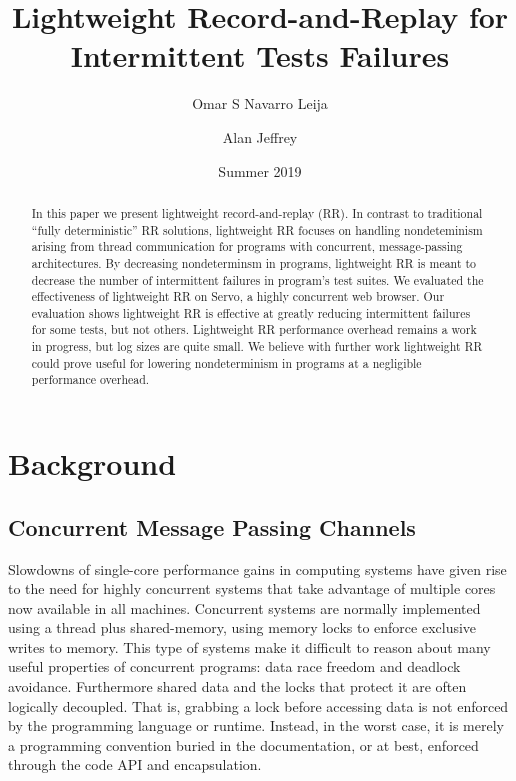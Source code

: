 \documentclass{article}
\begin{document}
\title{Lightweight Record-and-Replay for Intermittent Tests Failures}
\author[1]{Omar S Navarro Leija}
\author[2]{Alan Jeffrey}
\date{Summer 2019}
\maketitle

\begin{abstract}
  In this paper we present lightweight record-and-replay (RR).
  In contrast to traditional ``fully deterministic''
  RR solutions, lightweight RR focuses on handling nondeteminism arising from thread
  communication for programs with concurrent, message-passing
  architectures. By decreasing nondeterminsm in programs, lightweight RR is meant to
  decrease the number of intermittent failures in program's test suites.
  We evaluated the effectiveness of lightweight RR on Servo,
  a highly concurrent web browser. Our evaluation shows lightweight RR is effective
  at greatly reducing intermittent failures for some tests, but not others. Lightweight
  RR performance overhead remains a work in progress, but log sizes are quite small.
  We believe with further work lightweight RR could prove useful for
  lowering nondeterminism in programs at a negligible performance overhead.
\end{abstract}

\section{Background}

\subsection{Concurrent Message Passing Channels}
Slowdowns of single-core performance gains in computing systems have given rise to the need
for highly concurrent systems that take advantage of multiple cores now available
in all machines.
Concurrent systems are normally implemented using a thread plus shared-memory,
using memory locks to enforce exclusive writes to memory. This type of systems make
it difficult to reason about many useful properties of concurrent programs:
data race freedom and deadlock avoidance.
Furthermore shared data and the locks that protect it are often logically decoupled. That is,
grabbing a lock before accessing data is not enforced by the programming language or runtime.
Instead, in the worst case, it is merely a programming convention buried in the documentation,
or at best, enforced through the code API and encapsulation.
\end{document}
